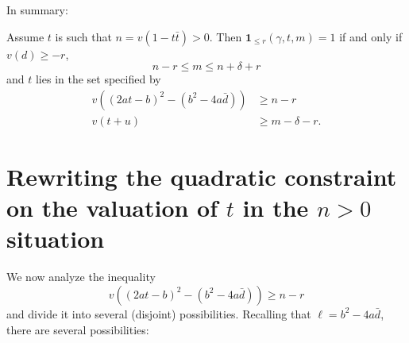 In summary:
\begin{proposition}
  Assume $t$ is such that $n = v(1-t \bar t) > 0$.
  Then $\mathbf{1}_{\le r}(\gamma, t, m) = 1$ if and only if $v(d) \ge -r$,
  \[ n - r \leq m \leq n + \delta + r \]
  and $t$ lies in the set specified by
  \begin{equation}
    \begin{aligned}
      v\left( (2at-b)^2 - (b^2-4a\bar d) \right) &\geq n-r \\
      v(t+u) &\ge m-\delta-r.
    \end{aligned}
    \label{eq:two_disks_S3}
  \end{equation}
\end{proposition}

\section{Rewriting the quadratic constraint on the valuation of $t$ in the $n > 0$ situation}
We now analyze the inequality
\begin{equation}
  v\left( (2at-b)^2 - (b^2-4a\bar d) \right) \geq n-r
  \label{eq:2atb_dos}
\end{equation}
and divide it into several (disjoint) possibilities.
Recalling that $\ell = b^2 - 4 a \bar d$, there are several possibilities:
